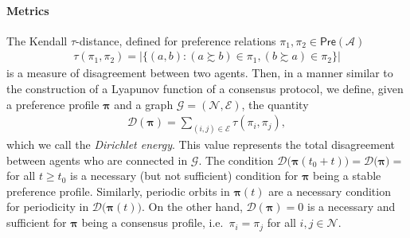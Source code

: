 \documentclass[conference]{ieeeconf}
\newcommand{\N}{\mathcal{N}}
\newcommand{\A}{\mathcal{A}}
\newcommand{\G}{\mathcal{G}}
\newcommand{\E}{\mathcal{E}}
\newcommand{\D}{\mathcal{D}}
\newcommand{\Pref}{\mathsf{Pre}}
\newcommand{\prefers}{\succsim}
\newcommand{\profile}{\boldsymbol{\pi}}
\renewcommand{\geq}{\geqslant}
\begin{document}
\paragraph*{Metrics}
The Kendall $\tau$-distance, defined for preference relations $\pi_1, \pi_2 \in \Pref(\A)$
\begin{align}
        \tau(\pi_1,\pi_2) = \big\vert \{ (a,b) : (a \prefers b) \in \pi_1, (b \prefers a) \in \pi_2  \} \big\vert \label{eq:kendall}
    \end{align}
is a measure of disagreement between two agents. Then, in a manner similar to the construction of a Lyapunov function of a consensus protocol, we define, given a preference profile $\profile$ and a graph $\G = (\N,\E)$, the quantity
\begin{align}
    \D(\profile) = \sum_{(i,j) \in \E} \tau(\pi_i,\pi_j), \label{eq:dirichlet}
\end{align}
which we call the \emph{Dirichlet energy}. This value represents the total disagreement between agents who are connected in $\G$. The condition $\D\bigl(\profile(t_0+t)\bigr) = \D\bigl(\profile\bigr) =$ for all $t \geq t_0$ is a necessary (but not sufficient) condition for $\profile$ being a stable preference profile. Similarly, periodic orbits in $\profile(t)$ are a necessary condition for periodicity in $\D\bigl( \profile(t)\bigr)$. On the other hand, $\D(\profile) = 0$ is a necessary and sufficient for $\profile$ being a consensus profile, i.e.~$\pi_i = \pi_j$ for all $i,j \in \N$.
\end{document}
